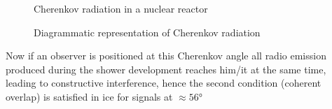 \documentclass[11pt,a4paper,faculty=we,language=en,doctype=report]{cls/ugent-doc}
\begin{document}
\begin{figure}
\centering
\begin{minipage}{0.45\textwidth}
	\centering
	\caption{Cherenkov radiation in a nuclear reactor}
	\label{figure: Cherenkov reactor}
\end{minipage}
\hspace{0.05\textwidth}
\begin{minipage}{0.45\textwidth}
	\centering
	\caption{Diagrammatic representation of Cherenkov radiation}
	\label{figure: Cherenkov illustratie}
\end{minipage}
\end{figure}
Now if an observer is positioned at this Cherenkov angle all radio emission produced during the shower development reaches him/it at the same time, leading to constructive interference, hence the second condition (coherent overlap) is satisfied in ice for signals at $\approx 56$°
\end{document}
